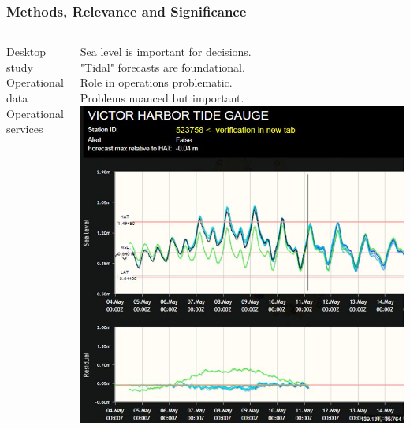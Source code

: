 \begin{frame}
\frametitle{Methods, Relevance and Significance}
\begin{columns}

\centering
Desktop study\\
Operational data\\
Operational services

\vspace{1cm}
Sea level is important for decisions.\\
"Tidal" forecasts are foundational.\\
Role in operations problematic. \\
Problems nuanced but important.\\


\centering
\includegraphics[height=0.5\textheight]{figures/plots/aggsealevelEgVictorHarbor.png}
\end{columns}
\end{frame}
